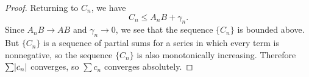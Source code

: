 \begin{proof}
  Returning to $C_n$, we have
  \begin{equation*}
    C_n \leq A_nB + \gamma_n.
  \end{equation*}
  Since $A_nB\to AB$ and $\gamma_n\to0$, we see that the sequence
  $\{C_n\}$ is bounded above. But $\{C_n\}$ is a sequence of partial
  sums for a series in which every term is nonnegative, so the
  sequence $\{C_n\}$ is also monotonically increasing. Therefore
  $\sum\lvert{c_n}\rvert$ converges, so $\sum c_n$ converges absolutely.
\end{proof}
